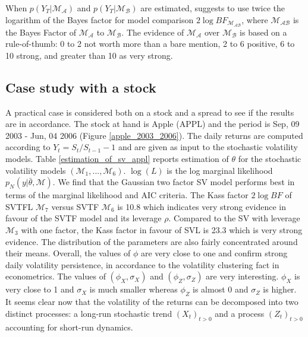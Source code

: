 \documentclass[11pt,a4,twosided,singlespacing,titlepagenumber=on]{scrreprt}
\numberwithin{equation}{chapter} %
\theoremstyle{remark}
\begin{document}
When $p(Y_T | \mathcal{M_A})$ and $p(Y_T | \mathcal{M_B})$ are estimated, \cite{kass1995} suggests to use twice the logarithm of the Bayes factor for model comparison $2 \log BF_{\mathcal{M_{AB}}}$, where $\mathcal{M_{AB}}$ is the Bayes Factor of $\mathcal{M_A}$ to $\mathcal{M_B}$. The evidence of $\mathcal{M_A}$ over $\mathcal{M_B}$ is based on a rule-of-thumb: 0 to 2 not worth more than a bare mention, 2 to 6 positive, 6 to 10 strong, and greater than 10 as very strong.


\subsection{Case study with a stock}
A practical case is considered both on a stock and a spread to see if the results are in accordance. The stock at hand is Apple (APPL) and the period is Sep, 09 2003 - Jun, 04 2006 (Figure \ref{apple_2003_2006}). The daily returns are computed according to $Y_t = S_t / S_{t-1} - 1$ and are given as input to the stochastic volatility models. Table \ref{estimation_of_sv_appl} reports estimation of $\theta$ for the stochastic volatility models $(\mathcal{M}_1, ..., \mathcal{M}_6)$. $\log (L)$ is the log marginal likelihood $p_N(y|\bar{\theta}, \mathcal{M})$. We find that the Gaussian two factor SV model performs best in terms of the marginal likelihood and AIC criteria. The Kass factor $2 \log BF$ of SVTFL $\mathcal{M}_7$ versus SVTF $\mathcal{M}_6$ is 10.8 which indicates very strong evidence in favour of the SVTF model and its leverage $\rho$. Compared to the SV with leverage $\mathcal{M}_3$ with one factor, the Kass factor in favour of SVL is 23.3 which is very strong evidence. The distribution of the parameters are also fairly concentrated around their means. Overall, the values of $\phi$ are very close to one and confirm strong daily volatility persistence, in accordance to the volatility clustering fact in econometrics. The values of $(\phi_X, \sigma_X)$ and $(\phi_Z, \sigma_Z)$ are very interesting. $\phi_X$ is very close to 1 and $\sigma_X$ is much smaller whereas $\phi_Z$ is almost 0 and $\sigma_Z$ is higher. It seems clear now that the volatility of the returns can be decomposed into two distinct processes: a long-run stochastic trend $(X_t)_{t>0}$ and a process $(Z_t)_{t>0}$ accounting for short-run dynamics.
\end{document}
